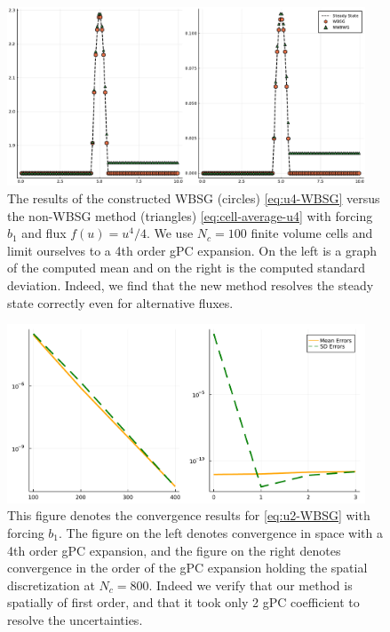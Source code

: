 \documentclass[12pt]{article}
\begin{document}
\begin{figure}[!htb]
    \centering
    \includegraphics[width=0.95\textwidth]{Figures/u4}
    \caption{The results of the constructed WBSG (circles) \eqref{eq:u4-WBSG} versus the non-WBSG method (triangles) \eqref{eq:cell-average-u4} with forcing $b_1$ and flux $f(u) = u^4/4$. We use $N_c = 100$ finite volume cells and limit ourselves to a 4th order gPC expansion. On the left is a graph of the computed mean and on the right is the computed standard deviation. Indeed, we find that the new method resolves the steady state correctly even for alternative fluxes.}
    \label{fig:u4}
\end{figure}
\begin{figure}[!htb]
    \centering
    \includegraphics[width=0.95\textwidth]{Figures/convergence}
    \caption{This figure denotes the convergence results for \eqref{eq:u2-WBSG} with forcing $b_1$. The figure on the left denotes convergence in space with a 4th order gPC expansion, and the figure on the right denotes convergence in the order of the gPC expansion holding the spatial discretization at $N_c = 800$. Indeed we verify that our method is spatially of first order, and that it took only 2 gPC coefficient to resolve the uncertainties.}
    \label{fig:convergence}
\end{figure}
\end{document}
